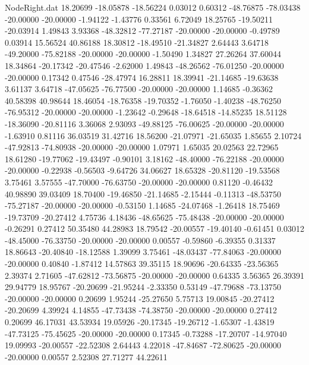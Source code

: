 \begin{filecontents}{NodeRight.dat}
  18.20699  -18.05878  -18.56224     0.03012    0.60312  -48.76875  -78.03438  -20.00000  -20.00000   -1.94122   -1.43776    0.33561    6.72049
  18.25765  -19.50211  -20.03914     1.49843    3.93368  -48.32812  -77.27187  -20.00000  -20.00000   -0.49789    0.03914   15.56524   40.86188
  18.30812  -18.49510  -21.34827     2.64443    3.64718  -49.20000  -75.82188  -20.00000  -20.00000   -1.50490    1.34827   27.26264   37.60044
  18.34864  -20.17342  -20.47546    -2.62000    1.49843  -48.26562  -76.01250  -20.00000  -20.00000    0.17342    0.47546  -28.47974   16.28811
  18.39941  -21.14685  -19.63638     3.61137    3.64718  -47.05625  -76.77500  -20.00000  -20.00000    1.14685   -0.36362   40.58398   40.98644
  18.46054  -18.76358  -19.70352    -1.76050   -1.40238  -48.76250  -76.95312  -20.00000  -20.00000   -1.23642   -0.29648  -18.64518  -14.85235
  18.51128  -18.36090  -20.81116     3.36068    2.93093  -49.88125  -76.00625  -20.00000  -20.00000   -1.63910    0.81116   36.03519   31.42716
  18.56200  -21.07971  -21.65035     1.85655    2.10724  -47.92813  -74.80938  -20.00000  -20.00000    1.07971    1.65035   20.02563   22.72965
  18.61280  -19.77062  -19.43497    -0.90101    3.18162  -48.40000  -76.22188  -20.00000  -20.00000   -0.22938   -0.56503   -9.64726   34.06627
  18.65328  -20.81120  -19.53568     3.75461    3.57555  -47.70000  -76.63750  -20.00000  -20.00000    0.81120   -0.46432   40.98890   39.03409
  18.70400  -19.46850  -21.14685    -2.15444   -0.11313  -48.53750  -75.27187  -20.00000  -20.00000   -0.53150    1.14685  -24.07468   -1.26418
  18.75469  -19.73709  -20.27412     4.75736    4.18436  -48.65625  -75.48438  -20.00000  -20.00000   -0.26291    0.27412   50.35480   44.28983
  18.79542  -20.00557  -19.40140    -0.61451    0.03012  -48.45000  -76.33750  -20.00000  -20.00000    0.00557   -0.59860   -6.39355    0.31337
  18.86643  -20.40840  -18.12588     1.39099    3.75461  -48.03437  -77.84063  -20.00000  -20.00000    0.40840   -1.87412   14.57863   39.35115
  18.90696  -20.64335  -23.56365     2.39374    2.71605  -47.62812  -73.56875  -20.00000  -20.00000    0.64335    3.56365   26.39391   29.94779
  18.95767  -20.20699  -21.95244    -2.33350    0.53149  -47.79688  -73.13750  -20.00000  -20.00000    0.20699    1.95244  -25.27650    5.75713
  19.00845  -20.27412  -20.20699     4.39924    4.14855  -47.73438  -74.38750  -20.00000  -20.00000    0.27412    0.20699   46.17031   43.53934
  19.05926  -20.17345  -19.26712    -1.65307   -1.43819  -47.73125  -75.45625  -20.00000  -20.00000    0.17345   -0.73288  -17.20707  -14.97040
  19.09993  -20.00557  -22.52308     2.64443    4.22018  -47.84687  -72.80625  -20.00000  -20.00000    0.00557    2.52308   27.71277   44.22611

\end{filecontents}
